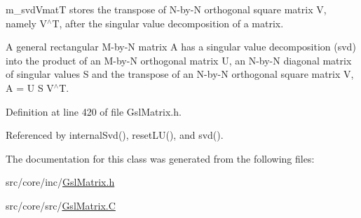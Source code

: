 m\-\_\-svd\-Vmat\-T stores the transpose of N-\/by-\/\-N orthogonal square matrix V, namely V$^\wedge$\-T, after the singular value decomposition of a matrix. 

A general rectangular M-\/by-\/\-N matrix A has a singular value decomposition (svd) into the product of an M-\/by-\/\-N orthogonal matrix U, an N-\/by-\/\-N diagonal matrix of singular values S and the transpose of an N-\/by-\/\-N orthogonal square matrix V, A = U S V$^\wedge$\-T. 

Definition at line 420 of file Gsl\-Matrix.\-h.



Referenced by internal\-Svd(), reset\-L\-U(), and svd().



The documentation for this class was generated from the following files\-:\begin{DoxyCompactItemize}
\item 
src/core/inc/\hyperlink{_gsl_matrix_8h}{Gsl\-Matrix.\-h}\item 
src/core/src/\hyperlink{_gsl_matrix_8_c}{Gsl\-Matrix.\-C}\end{DoxyCompactItemize}
